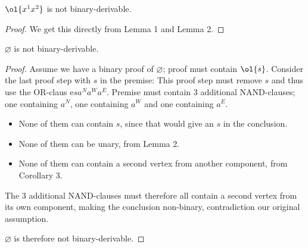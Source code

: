 \begin{corollary}
  $\ol{x^1x^2}$ is not binary-derivable.
  \label{thm:non_binary_derivable_uv}
\end{corollary}

\begin{proof}
  We get this directly from Lemma 1 and Lemma 2.
\end{proof}

\begin{theorem}
  $\varnothing$ is not binary-derivable.
  \label{thm:non_binary_derivable_paradox}
\end{theorem}

\begin{proof}
  Assume we have a binary proof of $\varnothing$;
  proof must contain $\ol{s}$.
  Consider the last proof step with $s$ in the premise:
  This proof step must remove $s$ and thus use the OR-claus e$sa^Na^Wa^E$.
  Premise must contain 3 additional NAND-clauses;
  one containing $a^N$, one containing $a^W$ and one containing $a^E$.
  \begin{itemize}
    \item None of them can contain $s$, since that would give an $s$ in the conclusion.
    \item None of them can be unary, from Lemma 2.
    \item None of them can contain a second vertex from another component, from Corollary 3.
  \end{itemize}
  The 3 additional NAND-clauses must therefore all contain a second vertex from its own component,
  making the conclusion non-binary, contradiction our original assumption.

  $\varnothing$ is therefore not binary-derivable.
\end{proof}
